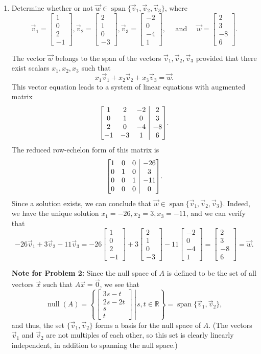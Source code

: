 \documentclass[12pt]{article}
\makeatletter
\newenvironment{amatrix}[1]{%
  \left[\begin{array}{@{}*{#1}{c}|c@{}}
}{%
  \end{array}\right]
}
\newcommand{\R}{\mathbb{R}}
\newcommand{\bbm}{\begin{bmatrix}}
\newcommand{\ebm}{\end{bmatrix}}
\newcommand{\bam}{\begin{amatrix}}
\newcommand{\eam}{\end{amatrix}}
\makeatother
\begin{document}
\begin{enumerate}
\bigskip


\item Determine whether or not $\vec{w}\in \operatorname{span}\{\vec{v}_1,\vec{v}_2, \vec{v}_3\}$, where
\[
 \vec{v}_1 = \bbm 1\\0\\2\\-1\ebm, \vec{v}_2 = \bbm 2\\1\\0\\-3\ebm, \vec{v}_3 = \bbm -2\\0\\-4\\1\ebm, \quad \text{ and } \quad \vec{w} = \bbm 2\\3\\-8\\6\ebm.
\]

\bigskip

The vector $\vec{w}$ belongs to the span of the vectors $\vec{v}_1,\vec{v}_2,\vec{v}_3$ provided that there exist scalars $x_1,x_2,x_3$ such that
\[
 x_1\vec{v}_1+x_2\vec{v}_2+x_3\vec{v}_3=\vec{w}.
\]
This vector equation leads to a system of linear equations with augmented matrix 
\[
 \bam{3}1&2&-2&2\\0&1&0&3\\2&0&-4&-8\\-1&-3&1&6\eam.
\]
The reduced row-echelon form of this matrix is
\[
 \bam{3}1&0&0&-26\\0&1&0&3\\0&0&1&-11\\0&0&0&0\eam.
\]
Since a solution exists, we can conclude that $\vec{w}\in \operatorname{span}\{\vec{v}_1,\vec{v}_2, \vec{v}_3\}$. Indeed, we have the unique solution $x_1=-26, x_2=3, x_3=-11$, and we can verify that
\[
 -26\vec{v}_1+3\vec{v}_2-11\vec{v}_3 = -26\bbm 1\\0\\2\\-1\ebm +3\bbm 2\\1\\0\\-3\ebm-11\bbm -2\\0\\-4\\1\ebm = \bbm 2\\3\\-8\\6\ebm = \vec{w}.
\]


\vspace{0.5in}

\textbf{Note for Problem 2:} Since the null space of $A$ is defined to be the set of all vectors $\vec{x}$ such that $A\vec{x}=\vec{0}$, we see that
\[
 \operatorname{null}(A) = \left\{\left.  \bbm 3s-t\\2s-2t\\s\\t\ebm \,\right|\, s,t\in\R\right\} = \operatorname{span}\{\vec{v}_1,\vec{v}_2\},
\]
and thus, the set $\{\vec{v}_1,\vec{v}_2\}$ forms a basis for the null space of $A$. (The vectors $\vec{v}_1$ and $\vec{v}_2$ are not multiples of each other, so this set is clearly linearly independent, in addition to spanning the null space.)


\end{enumerate}
\end{document}
